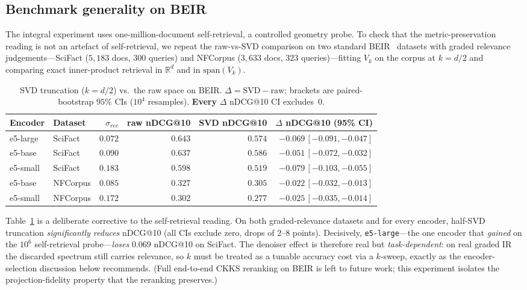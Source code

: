 \documentclass[11pt,a4paper]{article}
\begin{document}
\subsection{Benchmark generality on BEIR}
\label{ssec:beir}

The integral experiment uses one-million-document self-retrieval, a
controlled geometry probe. To check that the metric-preservation reading
is not an artefact of self-retrieval, we repeat the raw-vs-SVD comparison
on two standard BEIR~\cite{ref_beir} datasets with graded relevance
judgements---SciFact ($5{,}183$ docs, $300$ queries) and NFCorpus ($3{,}633$
docs, $323$ queries)---fitting $V_k$ on the corpus at $k=d/2$ and comparing
exact inner-product retrieval in $\mathbb{R}^d$ and in
$\mathrm{span}(V_k)$.

\begin{table}[tbp]
\centering
\caption{SVD truncation ($k=d/2$) vs.\ the raw space on BEIR.
$\Delta=\mathrm{SVD}-\mathrm{raw}$; brackets are paired-bootstrap $95\%$
CIs ($10^4$ resamples). \textbf{Every} $\Delta$ nDCG@10 CI excludes~$0$.}
\label{tab:beir}
\footnotesize
\setlength{\tabcolsep}{4pt}
\begin{tabular}{@{}llrrrr@{}}
\toprule
Encoder & Dataset & $\sigma_{rec}$ & raw nDCG@10 & SVD nDCG@10 & $\Delta$ nDCG@10 (95\% CI) \\
\midrule
e5-large & SciFact  & $0.072$ & $0.643$ & $0.574$ & $-0.069\,[-0.091,-0.047]$ \\
e5-base  & SciFact  & $0.090$ & $0.637$ & $0.586$ & $-0.051\,[-0.072,-0.032]$ \\
e5-small & SciFact  & $0.183$ & $0.598$ & $0.519$ & $-0.079\,[-0.103,-0.055]$ \\
e5-base  & NFCorpus & $0.085$ & $0.327$ & $0.305$ & $-0.022\,[-0.032,-0.013]$ \\
e5-small & NFCorpus & $0.172$ & $0.302$ & $0.277$ & $-0.025\,[-0.035,-0.014]$ \\
\bottomrule
\end{tabular}
\end{table}

Table~\ref{tab:beir} is a deliberate corrective to the self-retrieval
reading. On both graded-relevance datasets and for every encoder, half-SVD
truncation \emph{significantly reduces} nDCG@10 (all CIs exclude zero,
drops of $2$--$8$ points). Decisively, \texttt{e5-large}---the one encoder
that \emph{gained} on the $10^6$ self-retrieval probe---\emph{loses}
$0.069$ nDCG@10 on SciFact. The denoiser effect is therefore real but
\emph{task-dependent}: on real graded IR the discarded spectrum still
carries relevance, so $k$ must be treated as a tunable accuracy cost via a
$k$-sweep, exactly as the encoder-selection discussion below recommends.
(Full end-to-end CKKS reranking on BEIR is left to future work; this
experiment isolates the projection-fidelity property that the reranking
preserves.)
\end{document}
